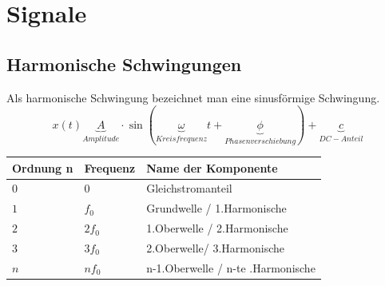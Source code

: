 \section{Signale}
\subsection{Harmonische Schwingungen}
Als harmonische Schwingung bezeichnet man eine sinusförmige Schwingung. 
\begin{equation*}
x(t) \underbrace{A}_{Amplitude} \cdot \sin(\underbrace{\omega}_{Kreisfrequenz}t +\underbrace{\phi}_{Phasenverschiebung})+\underbrace{c}_{DC-Anteil}
\end{equation*}
\begin{tabular}{|l|l|l|}
	\hline
	\textbf{Ordnung n}& \textbf{Frequenz}& \textbf{Name der Komponente}\\
	\hline $0$& $0$& Gleichstromanteil\\
	\hline $1$& $f_0$& Grundwelle / 1.Harmonische\\
	\hline $2$& $2f_0$& 1.Oberwelle / 2.Harmonische\\
	\hline $3$& $3f_0$& 2.Oberwelle/ 3.Harmonische\\
	\hline $n$& $nf_0$& n-1.Oberwelle / n-te .Harmonische\\
	\hline
\end{tabular}
\clearpage
\pagebreak
